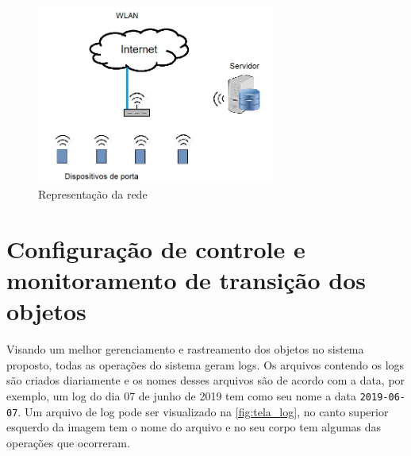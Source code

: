 
\begin{figure}[H]
              \caption{\label{fig:representacao_rede}{Representação da rede}}
              \centering
              \includegraphics[width=0.7\textwidth]{Figuras/rede.png}
\end{figure}



\section{Configuração de controle e monitoramento de transição dos objetos}


\par 
Visando um melhor gerenciamento e rastreamento dos objetos no sistema proposto, todas as operações do sistema geram logs. Os arquivos contendo os logs são criados diariamente e os nomes desses arquivos são de acordo com a data, por exemplo, um log do dia 07 de junho de 2019 tem como seu nome a data \texttt{2019-06-07}. Um arquivo de log pode ser visualizado na \autoref{fig:tela_log}, no canto superior esquerdo da imagem tem o nome do arquivo e no seu corpo tem algumas das operações que ocorreram.

